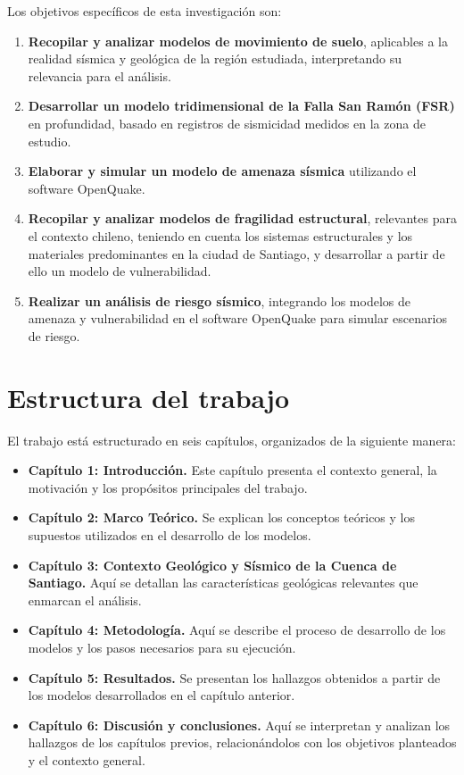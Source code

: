 Los objetivos específicos de esta investigación son:

\begin{enumerate}
    \item \textbf{Recopilar y analizar modelos de movimiento de suelo}, aplicables a la realidad sísmica y geológica de la región estudiada, interpretando su relevancia para el análisis.
    \item \textbf{Desarrollar un modelo tridimensional de la Falla San Ramón (FSR)} en profundidad, basado en registros de sismicidad medidos en la zona de estudio.
    \item \textbf{Elaborar y simular un modelo de amenaza sísmica} utilizando el software OpenQuake.
    \item \textbf{Recopilar y analizar modelos de fragilidad estructural}, relevantes para el contexto chileno, teniendo en cuenta los sistemas estructurales y los materiales predominantes en la ciudad de Santiago, y desarrollar a partir de ello un modelo de vulnerabilidad.
    \item \textbf{Realizar un análisis de riesgo sísmico}, integrando los modelos de amenaza y vulnerabilidad en el software OpenQuake para simular escenarios de riesgo.
\end{enumerate}

\section{Estructura del trabajo}

El trabajo está estructurado en seis capítulos, organizados de la siguiente manera:

\begin{itemize}
    \item \textbf{Capítulo 1: Introducción.} Este capítulo presenta el contexto general, la motivación y los propósitos principales del trabajo.
    \item \textbf{Capítulo 2: Marco Teórico.} Se explican los conceptos teóricos y los supuestos utilizados en el desarrollo de los modelos.
    \item \textbf{Capítulo 3: Contexto Geológico y Sísmico de la Cuenca de Santiago.} Aquí se detallan las características geológicas relevantes que enmarcan el análisis.
    \item \textbf{Capítulo 4: Metodología.} Aquí se describe el proceso de desarrollo de los modelos y los pasos necesarios para su ejecución.
    \item \textbf{Capítulo 5: Resultados.} Se presentan los hallazgos obtenidos a partir de los modelos desarrollados en el capítulo anterior.
    \item \textbf{Capítulo 6: Discusión y conclusiones.} Aquí se interpretan y analizan los hallazgos de los capítulos previos, relacionándolos con los objetivos planteados y el contexto general.
\end{itemize}

